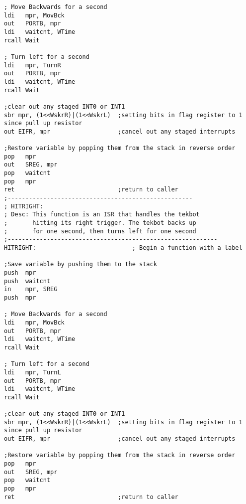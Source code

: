 \documentclass[12pt,letterpaper]{article}
\begin{document}
\begin{verbatim}
; Move Backwards for a second
ldi   mpr, MovBck
out   PORTB, mpr
ldi   waitcnt, WTime
rcall Wait

; Turn left for a second
ldi   mpr, TurnR
out   PORTB, mpr
ldi   waitcnt, WTime
rcall Wait

;clear out any staged INT0 or INT1
sbr mpr, (1<<WskrR)|(1<<WskrL)	;setting bits in flag register to 1 since pull up resistor
out EIFR, mpr					;cancel out any staged interrupts

;Restore variable by popping them from the stack in reverse order
pop   mpr
out   SREG, mpr
pop   waitcnt
pop   mpr
ret								;return to caller
;----------------------------------------------------
; HITRIGHT: 
; Desc: This function is an ISR that handles the tekbot
;		hitting its right trigger. The tekbot backs up
;		for one second, then turns left for one second
;-----------------------------------------------------------
HITRIGHT:							; Begin a function with a label

;Save variable by pushing them to the stack
push  mpr
push  waitcnt
in    mpr, SREG
push  mpr

; Move Backwards for a second
ldi   mpr, MovBck
out   PORTB, mpr
ldi   waitcnt, WTime
rcall Wait

; Turn left for a second
ldi   mpr, TurnL
out   PORTB, mpr
ldi   waitcnt, WTime
rcall Wait

;clear out any staged INT0 or INT1
sbr mpr, (1<<WskrR)|(1<<WskrL)	;setting bits in flag register to 1 since pull up resistor
out EIFR, mpr					;cancel out any staged interrupts

;Restore variable by popping them from the stack in reverse order
pop   mpr
out   SREG, mpr
pop   waitcnt
pop   mpr
ret								;return to caller
	\end{verbatim}
\end{document}
